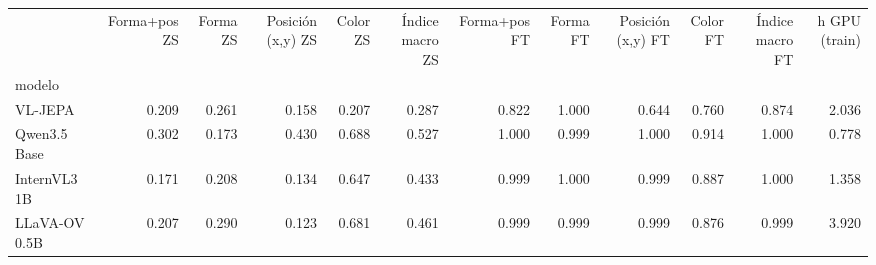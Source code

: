 \begin{tabular}{lrrrrrrrrrrr}
\toprule
 & Forma+pos ZS & Forma ZS & Posición (x,y) ZS & Color ZS & Índice macro ZS & Forma+pos FT & Forma FT & Posición (x,y) FT & Color FT & Índice macro FT & h GPU (train) \\
modelo &  &  &  &  &  &  &  &  &  &  &  \\
\midrule
VL-JEPA & 0.209 & 0.261 & 0.158 & 0.207 & 0.287 & 0.822 & 1.000 & 0.644 & 0.760 & 0.874 & 2.036 \\
Qwen3.5 Base & 0.302 & 0.173 & 0.430 & 0.688 & 0.527 & 1.000 & 0.999 & 1.000 & 0.914 & 1.000 & 0.778 \\
InternVL3 1B & 0.171 & 0.208 & 0.134 & 0.647 & 0.433 & 0.999 & 1.000 & 0.999 & 0.887 & 1.000 & 1.358 \\
LLaVA-OV 0.5B & 0.207 & 0.290 & 0.123 & 0.681 & 0.461 & 0.999 & 0.999 & 0.999 & 0.876 & 0.999 & 3.920 \\
\bottomrule
\end{tabular}
